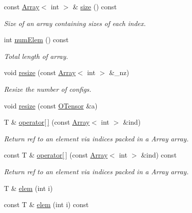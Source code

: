 \begin{DoxyCompactItemize}
const \mbox{\hyperlink{classXMLArray_1_1Array}{Array}}$<$ int $>$ \& \mbox{\hyperlink{classENSEM_1_1OTensor_aa34f5311f161a9b4aef0b08af6fb8d34}{size}} () const
\begin{DoxyCompactList}\small\item\em Size of an array containing sizes of each index. \end{DoxyCompactList}\item 
int \mbox{\hyperlink{classENSEM_1_1OTensor_a30a241a5b4f16fab55fd70ffee52828a}{num\+Elem}} () const
\begin{DoxyCompactList}\small\item\em Total length of array. \end{DoxyCompactList}\item 
void \mbox{\hyperlink{classENSEM_1_1OTensor_abe0bd734d08b1140d7794ec760a89435}{resize}} (const \mbox{\hyperlink{classXMLArray_1_1Array}{Array}}$<$ int $>$ \&\+\_\+nz)
\begin{DoxyCompactList}\small\item\em Resize the number of configs. \end{DoxyCompactList}\item 
void \mbox{\hyperlink{classENSEM_1_1OTensor_aee9b85f3726c01139b9194a3b95809d3}{resize}} (const \mbox{\hyperlink{classENSEM_1_1OTensor}{O\+Tensor}} \&a)
\item 
T \& \mbox{\hyperlink{classENSEM_1_1OTensor_adbfded2bb2af9d68e0a040df0d19b2d6}{operator\mbox{[}$\,$\mbox{]}}} (const \mbox{\hyperlink{classXMLArray_1_1Array}{Array}}$<$ int $>$ \&ind)
\begin{DoxyCompactList}\small\item\em Return ref to an element via indices packed in a Array array. \end{DoxyCompactList}\item 
const T \& \mbox{\hyperlink{classENSEM_1_1OTensor_aa649ae52fc364d173eb02db2fbee8172}{operator\mbox{[}$\,$\mbox{]}}} (const \mbox{\hyperlink{classXMLArray_1_1Array}{Array}}$<$ int $>$ \&ind) const
\begin{DoxyCompactList}\small\item\em Return ref to an element via indices packed in a Array array. \end{DoxyCompactList}\item 
T \& \mbox{\hyperlink{classENSEM_1_1OTensor_a18a4095f1e99228c27768fbea8eec05d}{elem}} (int i)
\item 
const T \& \mbox{\hyperlink{classENSEM_1_1OTensor_a788f146a247856d6b391cfd8f903657b}{elem}} (int i) const

\end{DoxyCompactItemize}

